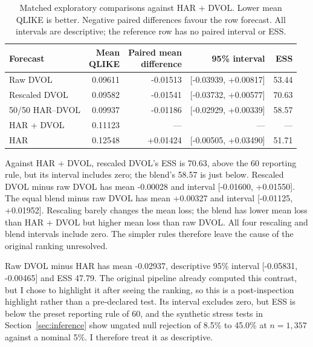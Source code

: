 \documentclass[10pt,a4paper]{article}
\newcommand{\ConfidencePercent}{95}
\newcommand{\PairedLossEffectiveN}{51.71}
\newcommand{\MinimumEffectiveN}{60}
\newcommand{\MeanQLIKEDvol}{0.09611}
\newcommand{\MeanQLIKEHar}{0.12548}
\newcommand{\MeanQLIKEHardvol}{0.11123}
\newcommand{\SimulationLongNGrouped}{1{,}357}
\newcommand{\NullScenarioERejectionPercent}{45.0}
\newcommand{\NullScenarioFRejectionPercent}{8.5}
\newcommand{\NominalRejectionPercent}{5}
\newcommand{\RawPairedMean}{-0.01513}
\newcommand{\RawPairedLower}{-0.03939}
\newcommand{\RawPairedUpper}{+0.00817}
\newcommand{\RawPairedESS}{53.44}
\newcommand{\MeanQLIKERescaled}{0.09582}
\newcommand{\RescaledMean}{-0.01541}
\newcommand{\RescaledLower}{-0.03732}
\newcommand{\RescaledUpper}{+0.00577}
\newcommand{\RescaledESS}{70.63}
\newcommand{\MeanQLIKEEqual}{0.09937}
\newcommand{\EqualMean}{-0.01186}
\newcommand{\EqualLower}{-0.02929}
\newcommand{\EqualUpper}{+0.00339}
\newcommand{\EqualESS}{58.57}
\newcommand{\RescaledRawMean}{-0.00028}
\newcommand{\RescaledRawLower}{-0.01600}
\newcommand{\RescaledRawUpper}{+0.01550}
\newcommand{\EqualRawMean}{+0.00327}
\newcommand{\EqualRawLower}{-0.01125}
\newcommand{\EqualRawUpper}{+0.01952}
\newcommand{\HarAugmentedMean}{+0.01424}
\newcommand{\HarAugmentedLower}{-0.00505}
\newcommand{\HarAugmentedUpper}{+0.03490}
\newcommand{\BlendPercent}{50}
\newcommand{\RawHarMean}{-0.02937}
\newcommand{\RawHarLower}{-0.05831}
\newcommand{\RawHarUpper}{-0.00465}
\newcommand{\RawHarESS}{47.79}
\begin{document}
\begin{table}[H]
\centering\small\setlength{\tabcolsep}{5pt}
\caption{Matched exploratory comparisons against HAR + DVOL. Lower mean QLIKE is better. Negative paired differences favour the row forecast. All intervals are descriptive; the reference row has no paired interval or ESS.}
\label{tab:forecasts}
\begin{tabular}{lrrrr}
\toprule
Forecast & \shortstack{Mean\\QLIKE} & \shortstack{Paired mean\\difference} & \ConfidencePercent{}\% interval & ESS \\
\midrule
Raw DVOL & \MeanQLIKEDvol{} & \RawPairedMean{} & [\RawPairedLower{}, \RawPairedUpper{}] & \RawPairedESS{} \\
Rescaled DVOL & \MeanQLIKERescaled{} & \RescaledMean{} & [\RescaledLower{}, \RescaledUpper{}] & \RescaledESS{} \\
\BlendPercent{}/\BlendPercent{} HAR--DVOL & \MeanQLIKEEqual{} & \EqualMean{} & [\EqualLower{}, \EqualUpper{}] & \EqualESS{} \\
HAR + DVOL & \MeanQLIKEHardvol{} & --- & --- & --- \\
HAR & \MeanQLIKEHar{} & \HarAugmentedMean{} & [\HarAugmentedLower{}, \HarAugmentedUpper{}] & \PairedLossEffectiveN{} \\
\bottomrule
\end{tabular}
\end{table}

Against HAR + DVOL, rescaled DVOL's ESS is \RescaledESS{}, above the \MinimumEffectiveN{} reporting rule, but its interval includes zero; the blend's \EqualESS{} is just below. Rescaled DVOL minus raw DVOL has mean \RescaledRawMean{} and interval [\RescaledRawLower{}, \RescaledRawUpper{}]. The equal blend minus raw DVOL has mean \EqualRawMean{} and interval [\EqualRawLower{}, \EqualRawUpper{}]. Rescaling barely changes the mean loss; the blend has lower mean loss than HAR + DVOL but higher mean loss than raw DVOL. All four rescaling and blend intervals include zero. The simpler rules therefore leave the cause of the original ranking unresolved.

Raw DVOL minus HAR has mean \RawHarMean{}, descriptive \ConfidencePercent{}\% interval [\RawHarLower{}, \RawHarUpper{}] and ESS \RawHarESS{}. The original pipeline already computed this contrast, but I chose to highlight it after seeing the ranking, so this is a post-inspection highlight rather than a pre-declared test. Its interval excludes zero, but ESS is below the preset reporting rule of \MinimumEffectiveN{}, and the synthetic stress tests in Section~\ref{sec:inference} show ungated null rejection of \NullScenarioFRejectionPercent{}\% to \NullScenarioERejectionPercent{}\% at $n=\SimulationLongNGrouped{}$ against a nominal \NominalRejectionPercent{}\%. I therefore treat it as descriptive.
\end{document}
